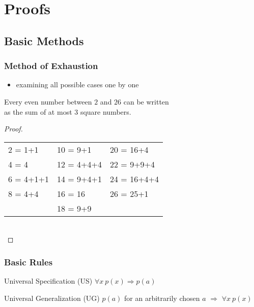 \documentclass[dvipsnames]{beamer}
\begin{document}
\section{Proofs}

\subsection{Basic Methods}

\begin{frame}
  \frametitle{Method of Exhaustion}

  \begin{itemize}
    \item examining all possible cases one by one
  \end{itemize}

  \pause
  \begin{theorem}
    Every even number between $2$ and $26$ can be written\\
    as the sum of at most 3 square numbers.
  \end{theorem}

  \begin{proof}
    \begin{tabular}{lll}
      2 = 1+1   & 10 = 9+1    & 20 = 16+4\\
      4 = 4     & 12 = 4+4+4  & 22 = 9+9+4\\
      6 = 4+1+1 & 14 = 9+4+1  & 24 = 16+4+4\\
      8 = 4+4   & 16 = 16     & 26 = 25+1\\
                & 18 = 9+9    &
    \end{tabular}\\
  \end{proof}
\end{frame}

\begin{frame}
  \frametitle{Basic Rules}

  \begin{block}{Universal Specification (US)}
    $\forall x~p(x) \Rightarrow p(a)$
  \end{block}

  \pause
  \bigskip
  \begin{block}{Universal Generalization (UG)}
    $p(a)$ for an \alert{arbitrarily chosen} $a$
      $\Rightarrow$ $\forall x~p(x)$
  \end{block}
\end{frame}
\end{document}
